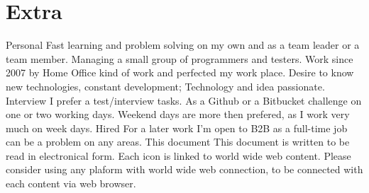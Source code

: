%
%
%
%


\section{Extra}

\cvline
    {Personal}
    {Fast learning and problem solving on my own and as a team leader or a team
    member. Managing a small group of programmers and testers. Work since 2007
    by Home Office kind of work and perfected my work place. Desire
    to know new technologies, constant development; Technology and idea passionate.}
    {}{}{}{}
\cvline
    {Interview}
    {I prefer a test/interview tasks. As a Github or a Bitbucket challenge on
    one or two working days. Weekend days are more then prefered, as I work
    very much on week days.}
    {}{}{}{}
\cvline
    {Hired}
    {For a later work I'm open to B2B as a full-time
    job can be a problem on any areas.}
    {}{}{}{}
\cvline
    {This document}
    {This document is written to be read in electronical form. Each icon is
    linked to world wide web content. Please consider using any plaform with
    world wide web connection, to be connected with each content via web
    browser.
    } {}{}{}{}
